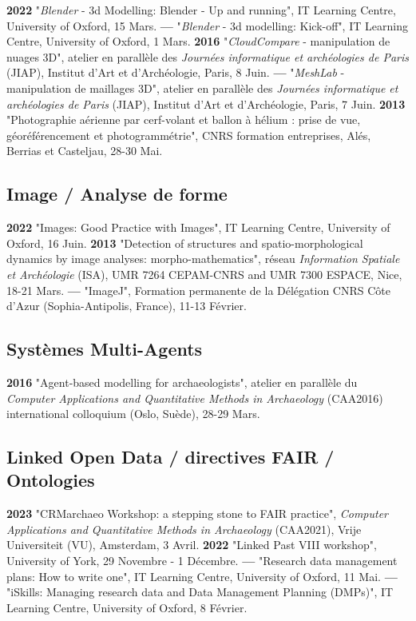 \documentclass{article}
\begin{document}
\textbf{2022 }"\textit{Blender} - 3d Modelling: Blender - Up and running", IT Learning Centre, University of Oxford, 15 Mars.
\smallbreak
\textbf{--- }"\textit{Blender} - 3d modelling: Kick-off", IT Learning Centre, University of Oxford, 1 Mars.
\smallbreak
\textbf{2016 }"\textit{CloudCompare} - manipulation de nuages 3D", atelier en parallèle des \textit{Journ\'{e}es informatique et arch\'{e}ologies de Paris} (JIAP), Institut d'Art et d'Arch\'{e}ologie, Paris, 8 Juin.
\smallbreak
\textbf{--- }"\textit{MeshLab }- manipulation de maillages 3D", atelier en parallèle des \textit{Journ\'{e}es informatique et arch\'{e}ologies de Paris} (JIAP), Institut d'Art et d'Arch\'{e}ologie, Paris, 7 Juin.
\smallbreak
\textbf{2013 }"Photographie aérienne par cerf-volant et ballon à hélium : prise de vue, géoréférencement et photogrammétrie", CNRS formation entreprises, Al\'{e}s, Berrias et Casteljau, 28-30 Mai.

\subsection*{Image / Analyse de forme}

\textbf{2022 }"Images: Good Practice with Images", IT Learning Centre, University of Oxford, 16 Juin.
\smallbreak
\textbf{2013 }"Detection of structures and spatio-morphological dynamics by image analyses: morpho-mathematics", réseau \textit{Information Spatiale et Arch\'{e}ologie} (ISA), UMR 7264 CEPAM-CNRS and UMR 7300 ESPACE, Nice, 18-21 Mars.
\smallbreak
\textbf{--- }"ImageJ", Formation permanente de la Délégation CNRS Côte d'Azur (Sophia-Antipolis, France), 11-13 Février.

\subsection*{Systèmes Multi-Agents}

\textbf{2016 }"Agent-based modelling for archaeologists", atelier en parallèle du \textit{Computer Applications and Quantitative Methods in Archaeology} (CAA2016) international colloquium (Oslo, Suède), 28-29 Mars.

\subsection*{Linked Open Data / directives FAIR / Ontologies}

\textbf{2023 }"CRMarchaeo Workshop: a stepping stone to FAIR practice", \textit{Computer Applications and Quantitative Methods in Archaeology} (CAA2021), Vrije Universiteit (VU), Amsterdam, 3 Avril.
\smallbreak
\textbf{2022 }"Linked Past VIII workshop", University of York, 29 Novembre - 1 Décembre.
\smallbreak
\textbf{--- }"Research data management plans: How to write one", IT Learning Centre, University of Oxford, 11 Mai.
\smallbreak
\textbf{--- }"iSkills: Managing research data and Data Management Planning (DMPs)", IT Learning Centre, University of Oxford, 8 Février.
\end{document}
